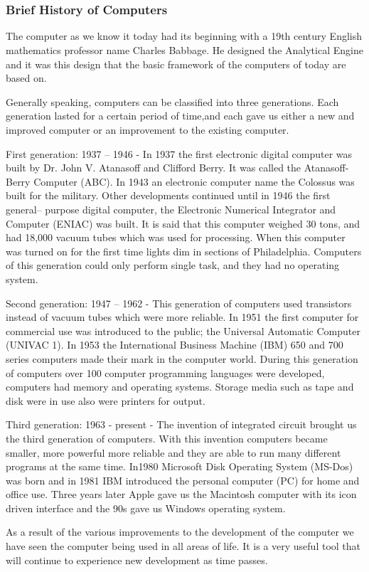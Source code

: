 \section{} 
\begin{frame}
\frametitle{Brief History of Computers}
	The computer as we know it today had its beginning with a 19th century English mathematics professor name Charles Babbage.
	He designed the Analytical Engine and it was this design that the basic framework of the computers of today are based on.
	
	Generally speaking, computers can be classified into three generations. Each generation lasted for a certain period of
	time,and each gave us either a new and improved computer or an improvement to the existing computer.
	
	First generation: 1937 – 1946 - In 1937 the first electronic digital computer was built by Dr. John V. Atanasoff and Clifford Berry. It was called the Atanasoff-Berry Computer (ABC). In 1943 an electronic computer name the Colossus was built for the military. Other developments continued until in 1946 the first general– purpose digital computer, the Electronic Numerical Integrator and Computer (ENIAC) was built. It is said that this computer weighed 30 tons, and had 18,000 vacuum tubes which was used for processing. When this computer was turned on for the first time lights dim in sections of Philadelphia. Computers of this generation could only perform single task, and they had no operating system.
	
	Second generation: 1947 – 1962 - This generation of computers used transistors instead of vacuum tubes which were more reliable. In 1951 the first computer for commercial use was introduced to the public; the Universal Automatic Computer (UNIVAC 1). In 1953 the International Business Machine (IBM) 650 and 700 series computers made their mark in the computer world. During this generation of computers over 100 computer programming languages were developed, computers had memory and operating systems. Storage media such as tape and disk were in use also were printers for output.
	
	Third generation: 1963 - present - The invention of integrated circuit brought us the third generation of computers. With this invention computers became smaller, more powerful more reliable and they are able to run many different programs at the same time. In1980 Microsoft Disk Operating System (MS-Dos) was born and in 1981 IBM introduced the personal computer (PC) for home and office use. Three years later Apple gave us the Macintosh computer with its icon driven interface and the 90s gave us Windows operating system.
	
	As a result of the various improvements to the development of the computer we have seen the computer being used in all areas of life. It is a very useful tool that will continue to experience new development as time passes.
\end{frame}
